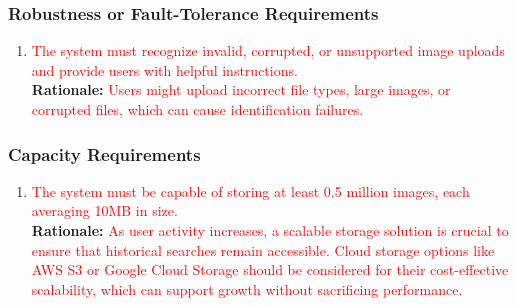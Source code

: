 \documentclass{article}
\begin{document}
\subsubsection{Robustness or Fault-Tolerance Requirements}
\label{ssub:robustness_or_fault_tolerance_requirements}
\begin{enumerate}[{PR-RFT}1. ]
	\item \textcolor{red}{The system must recognize invalid, corrupted, or unsupported image uploads and provide users with helpful instructions.}\\
	\textbf{Rationale:} \textcolor{red}{Users might upload incorrect file types, large images, or corrupted files, which can cause identification failures.}\\
\end{enumerate}

\subsubsection{Capacity Requirements}
\label{ssub:capacity_requirements}
\begin{enumerate}[{PR-C}1. ]
	\item \textcolor{red}{The system must be capable of storing at least 0.5 million images, each averaging 10MB in size.}\\
	\textbf{Rationale:} \textcolor{red}{As user activity increases, a scalable storage solution is crucial to ensure that historical searches remain accessible. Cloud storage options like AWS S3 or Google Cloud Storage should be considered for their cost-effective scalability, which can support growth without sacrificing performance.}\\
\end{enumerate}
\end{document}
